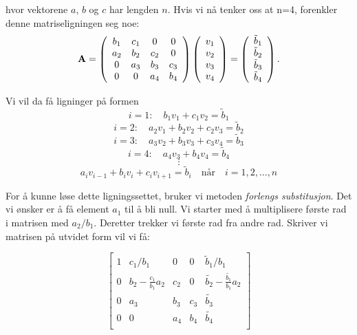\documentclass{article}
\begin{document}
hvor vektorene $a$, $b$ og $c$ har lengden $n$. Hvis vi nå tenker oss at n=4, forenkler denne matriseligningen seg noe:
\begin{equation}
    {\bf A} = \left(\begin{array}{cccccc}
                           b_1& c_1 & 0 &0 \\
                           a_2 & b_2 & c_2 &0 \\
                           0 & a_3 & b_3 & c_3 \\
                           0 & 0 & a_4 &  b_4  \\
                      \end{array} \right)\left(\begin{array}{c}
                           v_1\\
                           v_2\\
                           v_3\\
                          v_4  \\
                      \end{array} \right)
  =\left(\begin{array}{c}
                           \tilde{b}_1\\
                           \tilde{b}_2\\
                        \tilde{b}_3\\
                        \tilde{b}_4\\
                      \end{array} \right).
\end{equation}

Vi vil da få ligninger på formen
\[i=1: \quad b_1v_1 + c_1v_2 = \tilde{b}_1\]
\[i=2: \quad a_2v_1 + b_2v_2 + c_2v_3 = \tilde{b}_2\]
\[i=3: \quad a_3v_2 + b_3v_3 + c_3v_4 = \tilde{b}_3\]
\[i=4: \quad a_4v_3 + b_4v_4 = \tilde{b}_4\]
\[\vdots\]
\begin{equation}
a_iv_{i-1} + b_iv_i + c_iv_{i+1} = \tilde{b}_i \quad \textrm{når} \quad i = 1,2,...,n
\end{equation}

For å kunne løse dette ligningssettet, bruker vi metoden \textit{forlengs substitusjon}. Det vi ønsker er å få element $a_1$ til å bli null. Vi starter med å multiplisere første rad i matrisen med $a_2/b_1$. Deretter trekker vi første rad fra andre rad. Skriver vi matrisen på utvidet form vil vi få:

\[
\left[
\begin{array}{cccc|c}
1 & c_1/b_1 & 0 & 0 & \tilde{b}_1/b_1 \\
 0 & b_2 - \frac{c_1}{b_1}a_2  &c_2 &0 & \tilde{b_2} - \frac{\tilde{b_1}}{b_1}a_2\\
  0 & a_3 & b_3 & c_3 & \tilde{b_3}\\
  0 & 0 & a_4 & b_4 & \tilde{b_4}\\
\end{array}
\right]
\]
\end{document}
